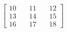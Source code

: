 \documentclass[preview]{standalone}
\begin{document}
\begin{align*}
\begin{bmatrix} 10 & \quad 11 & \quad 12 \\ 13 & \quad 14 & \quad 15 \\ 16 & \quad 17 & \quad 18 \end{bmatrix}
\end{align*}
\end{document}
